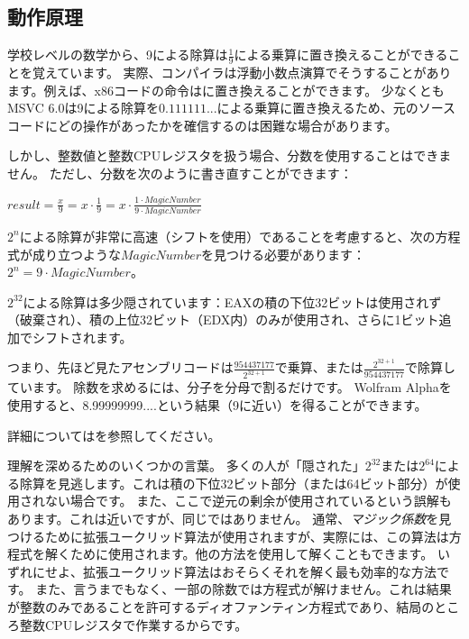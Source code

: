﻿\subsection{動作原理}

学校レベルの数学から、9による除算は$\frac{1}{9}$による乗算に置き換えることができることを覚えています。
実際、コンパイラは浮動小数点演算でそうすることがあります。例えば、x86コードの命令はに置き換えることができます。
少なくともMSVC 6.0は9による除算を$0.111111...$による乗算に置き換えるため、元のソースコードにどの操作があったかを確信するのは困難な場合があります。

しかし、整数値と整数CPUレジスタを扱う場合、分数を使用することはできません。
ただし、分数を次のように書き直すことができます：

\begin{center}
$result = \frac{x}{9} = x \cdot \frac{1}{9} = x \cdot \frac{1 \cdot MagicNumber}{9 \cdot MagicNumber}$
\end{center}

$2^n$による除算が非常に高速（シフトを使用）であることを考慮すると、次の方程式が成り立つような$MagicNumber$を見つける必要があります：$2^n = 9 \cdot MagicNumber$。

$2^{32}$による除算は多少隠されています：EAXの積の下位32ビットは使用されず（破棄され）、積の上位32ビット（EDX内）のみが使用され、さらに1ビット追加でシフトされます。

つまり、先ほど見たアセンブリコードは{\Large $\frac{954437177}{2^{32+1}}$}で乗算、または{\Large $\frac{2^{32+1}}{954437177}$}で除算しています。
除数を求めるには、分子を分母で割るだけです。
Wolfram Alphaを使用すると、8.99999999....という結果（9に近い）を得ることができます。


詳細についてはを参照してください。

理解を深めるためのいくつかの言葉。
多くの人が「隠された」$2^{32}$または$2^{64}$による除算を見逃します。これは積の下位32ビット部分（または64ビット部分）が使用されない場合です。
また、ここで逆元の剰余が使用されているという誤解もあります。これは近いですが、同じではありません。
通常、\textit{マジック係数}を見つけるために拡張ユークリッド算法が使用されますが、実際には、この算法は方程式を解くために使用されます。他の方法を使用して解くこともできます。
いずれにせよ、拡張ユークリッド算法はおそらくそれを解く最も効率的な方法です。
また、言うまでもなく、一部の除数では方程式が解けません。これは結果が整数のみであることを許可するディオファンティン方程式であり、結局のところ整数CPUレジスタで作業するからです。